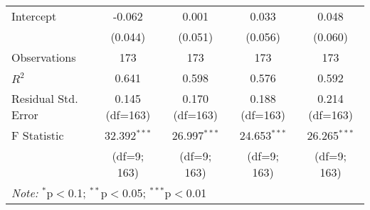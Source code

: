 \begin{table}[H]
\begin{tabular}{@{\extracolsep{5pt}}lcccc}
Intercept & -0.062 & 0.001 & 0.033 & 0.048 \\
          & (0.044) & (0.051) & (0.056) & (0.060) \\

\hline
Observations & 173 & 173 & 173 & 173 \\
$R^2$ & 0.641 & 0.598 & 0.576 & 0.592 \\
Residual Std. Error & 0.145 (df=163) & 0.170 (df=163) & 0.188 (df=163) & 0.214 (df=163) \\
F Statistic & 32.392$^{***}$ & 26.997$^{***}$ & 24.653$^{***}$ & 26.265$^{***}$ \\
            & (df=9; 163) & (df=9; 163) & (df=9; 163) & (df=9; 163) \\
\hline
\hline
\multicolumn{5}{l}{\textit{Note:} $^{*}$p$<$0.1; $^{**}$p$<$0.05; $^{***}$p$<$0.01} \\
\end{tabular}
\end{table}

